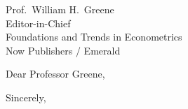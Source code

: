 \documentclass[11pt,a4paper]{letter}
\begin{document}
\begin{letter}{Prof.\ William H.\ Greene \\ Editor-in-Chief \\ Foundations and Trends in Econometrics \\ Now Publishers / Emerald}

\opening{Dear Professor Greene,}


\closing{Sincerely,}

\end{letter}
\end{document}

